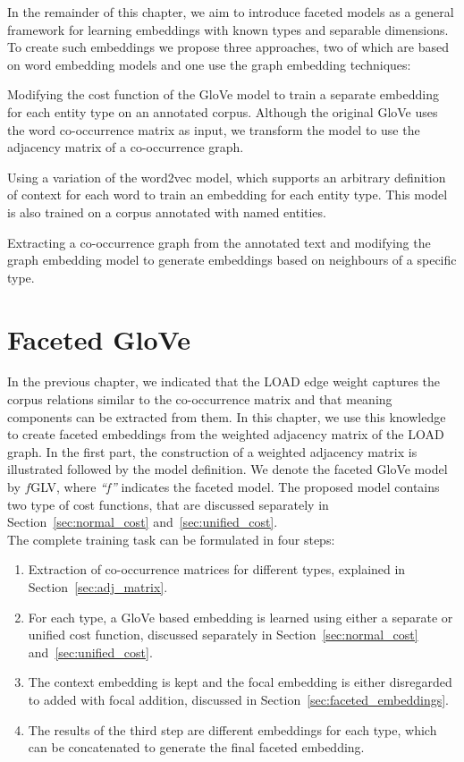 In the remainder of this chapter, we aim to introduce faceted models as a general framework for learning embeddings with known types and separable dimensions. To create such embeddings we propose three approaches, two of which are based on word embedding models and one use the graph embedding techniques: 
\begin{compactenum}
\item Modifying the cost function of the GloVe model to train a separate embedding for each entity type on an annotated corpus. Although the original GloVe uses the word co-occurrence matrix as input, we transform the model to use the adjacency matrix of a co-occurrence graph. 
\item Using a variation of the word2vec model, which supports an arbitrary definition of context for each word to train an embedding for each entity type. This model is also trained on a corpus annotated with named entities.
\item Extracting a co-occurrence graph from the annotated text and modifying the graph embedding model to generate embeddings based on neighbours of a specific type. 
\end{compactenum}
\section{Faceted GloVe}\label{sec:faceted_glove}
In the previous chapter, we indicated that the LOAD edge weight captures the corpus relations similar to the co-occurrence matrix and that meaning components can be extracted from them. In this chapter, we use this knowledge to create faceted embeddings from the weighted adjacency matrix of the LOAD graph. In the first part, the construction of a weighted adjacency matrix is illustrated followed by the model definition. We denote the faceted GloVe model by $f$GLV, where \emph{``f''} indicates the faceted model. The proposed model contains two type of cost functions, that are discussed separately in Section~\ref{sec:normal_cost} and~\ref{sec:unified_cost}. \\
The complete training task can be formulated in four steps: 
 \begin{enumerate}        
 \item Extraction of co-occurrence matrices for different types, explained in Section~\ref{sec:adj_matrix}. 
 \item For each type, a GloVe based embedding is learned using either a separate or unified cost function, discussed separately in Section~\ref{sec:normal_cost} and~\ref{sec:unified_cost}. 
 \item The context embedding is kept and the focal embedding is either disregarded to added with focal addition, discussed in Section~\ref{sec:faceted_embeddings}.
 \item The results of the third step are different embeddings for each type, which can be concatenated to generate the final faceted embedding. 
 \end{enumerate}
